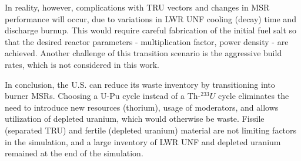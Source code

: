 In reality, however, complications with \gls{TRU} vectors and changes in \gls{MSR}
performance will occur, due to variations in \gls{LWR} \gls{UNF}
cooling (decay) time and discharge burnup. This would require careful fabrication of the initial fuel salt
so that the desired reactor parameters - multiplication factor, power density - are achieved. Another
challenge of this transition scenario is the aggressive build rates, which is not
considered in this work.

In conclusion, the U.S. can reduce its waste inventory by transitioning into
burner \glspl{MSR}. Choosing a U-Pu cycle instead of a Th-$^{233}U$ cycle
eliminates the need to introduce new resources (thorium), usage of moderators,
and allows utilization of depleted uranium, which would otherwise be waste.
Fissile (separated \gls{TRU}) and fertile (depleted uranium) material are
not limiting factors in the simulation, and a large inventory of \gls{LWR} \gls{UNF}
and depleted uranium remained at the end of the simulation.
